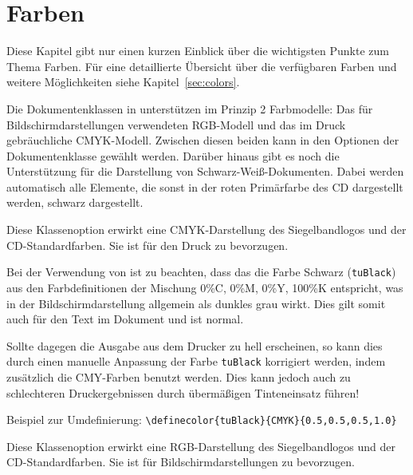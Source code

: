 \section{Farben}

Diese Kapitel gibt nur einen kurzen Einblick über die wichtigsten Punkte
zum Thema Farben. Für eine detaillierte Übersicht über die verfügbaren Farben
und weitere Möglichkeiten siehe Kapitel~\ref{sec:colors}.%

Die Dokumentenklassen in \tubslatex unterstützen im Prinzip 2 Farbmodelle:
Das für Bildschirmdarstellungen verwendeten RGB-Modell und das im
Druck gebräuchliche CMYK-Modell. Zwischen diesen beiden kann in den Optionen
der Dokumentenklasse gewählt werden. Darüber hinaus gibt es noch die Unterstützung
für die Darstellung von Schwarz-Weiß-Dokumenten. Dabei werden automatisch
alle Elemente, die sonst in der roten Primärfarbe des CD dargestellt werden,
schwarz dargestellt.

\begin{Declaration}
\end{Declaration}

Diese Klassenoption erwirkt eine CMYK-Darstellung des Siegelbandlogos und der
CD-Standardfarben. Sie ist für den Druck zu bevorzugen.

\begin{important}
  Bei der Verwendung von  ist zu beachten,
  dass das die Farbe Schwarz (\texttt{tuBlack})
  aus den Farbdefinitionen der Mischung 0\%C, 0\%M, 0\%Y, 100\%K entspricht,
  was in der Bildschirmdarstellung allgemein als dunkles grau wirkt. Dies
  gilt somit auch für den Text im Dokument und ist normal.

  Sollte dagegen die Ausgabe aus dem Drucker zu hell erscheinen, so kann dies
  durch einen manuelle Anpassung der Farbe \texttt{tuBlack} korrigiert werden,
  indem zusätzlich die CMY-Farben benutzt werden. Dies kann jedoch auch zu
  schlechteren Druckergebnissen durch übermäßigen Tinteneinsatz führen!
  
  Beispiel zur Umdefinierung:
  \lstinline!\definecolor{tuBlack}{CMYK}{0.5,0.5,0.5,1.0}!
\end{important}

\begin{Declaration}
\end{Declaration}

Diese Klassenoption erwirkt eine RGB-Darstellung des Siegelbandlogos und der
CD-Standardfarben. Sie ist für Bildschirmdarstellungen zu bevorzugen.

